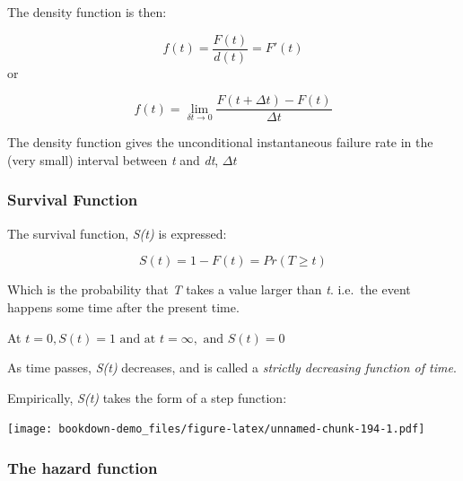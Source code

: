 \documentclass[
]{article}
\newenvironment{Shaded}{\begin{snugshade}}{\end{snugshade}}
\newcommand{\AttributeTok}[1]{\textcolor[rgb]{0.77,0.63,0.00}{#1}}
\newcommand{\DecValTok}[1]{\textcolor[rgb]{0.00,0.00,0.81}{#1}}
\newcommand{\FunctionTok}[1]{\textcolor[rgb]{0.00,0.00,0.00}{#1}}
\newcommand{\NormalTok}[1]{#1}
\newcommand{\OtherTok}[1]{\textcolor[rgb]{0.56,0.35,0.01}{#1}}
\newcommand{\SpecialCharTok}[1]{\textcolor[rgb]{0.00,0.00,0.00}{#1}}
\newcommand{\StringTok}[1]{\textcolor[rgb]{0.31,0.60,0.02}{#1}}
\begin{document}
The density function is then:

\[ f(t) = \frac{F(t)}{d(t)} = F'(t)\]
or

\[ f(t) = \lim_{\delta t \rightarrow 0} \frac{F(t+\Delta t) - F(t)}{\Delta t}\]

The density function gives the unconditional instantaneous failure rate in the (very small) interval between \emph{t} and \emph{dt}, \(\Delta t\)

\hypertarget{survival-function}{%
\subsubsection{Survival Function}\label{survival-function}}

The survival function, \emph{S(t)} is expressed:

\[ S(t) = 1 - F(t) = Pr (T \geqslant t)\]

Which is the probability that \emph{T} takes a value larger than \emph{t}. i.e.~the event happens some time after the present time.

At \(t = 0, S(t) =1 \text { and at } t= \infty, \text { and } S(t) =0\)

As time passes, \emph{S(t)} decreases, and is called a \emph{strictly decreasing function of time}.

Empirically, \emph{S(t)} takes the form of a step function:

\begin{Shaded}
\end{Shaded}

\texttt{[image: bookdown-demo\_files/figure-latex/unnamed-chunk-194-1.pdf]}

\hypertarget{the-hazard-function}{%
\subsubsection{The hazard function}\label{the-hazard-function}}
\end{document}

